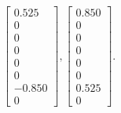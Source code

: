 \documentclass{amsart}
\theoremstyle{plain}
\theoremstyle{definition}
\theoremstyle{plain}
\begin{document}
\begin{equation*}
	\left[\begin{matrix}0.525\\0\\0\\0\\0\\0\\-0.850\\0\end{matrix}\right],
	\left[\begin{matrix}0.850\\0\\0\\0\\0\\0\\0.525\\0\end{matrix}\right].
\end{equation*} 
\end{document}
